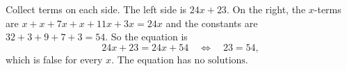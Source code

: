 Collect terms on each side. The left side is $24x+23$. On the right, the $x$-terms are $x+x+7x+x+11x+3x=24x$ and the constants are $32+3+9+7+3=54$. So the equation is
\[
24x+23=24x+54\quad\Longleftrightarrow\quad 23=54,
\]
which is false for every $x$. The equation has $\boxed{\text{no solutions}}$.
